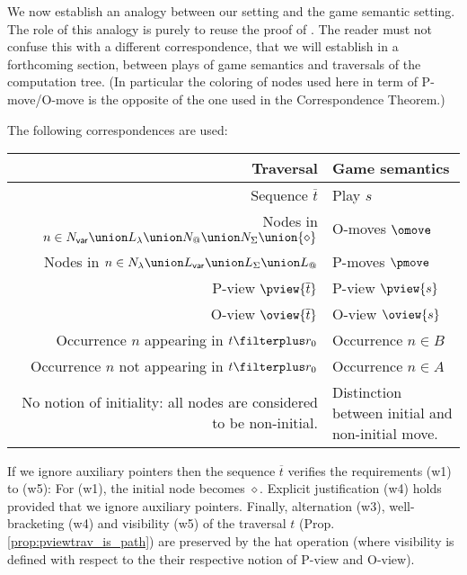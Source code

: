 We now establish an analogy between our setting and the game
semantic setting. The role of this analogy is purely to reuse the
proof of \cite{hylandong_pcf}. The reader must not confuse this with
a different correspondence, that we will establish in a forthcoming
section, between plays of game semantics and traversals of the
computation tree. (In particular the coloring of nodes used here in
term of P-move/O-move is the opposite of the one used in the
Correspondence Theorem.)

The following correspondences are used:
\begin{center}
\begin{tabular}{r|p{6cm}}
{\bf Traversal} & {\bf Game semantics} \\
\hline\hline
Sequence $\overline{t}$ & Play $s$ \\
Nodes in $n \in N_{\sf var} \union L_\lambda \union N_@ \union N_\Sigma \union \{\diamond\}$ & O-moves $\omove$ \\
Nodes in $n \in N_\lambda \union L_{\sf var} \union L_\Sigma \union L_@$ & P-moves $\pmove$\\
P-view $\pview{\overline{t}}$  & P-view $\pview{s}$\\
O-view $\oview{\overline{t}}$  & O-view $\oview{s}$\\
Occurrence $n$ appearing in $t\filterplus r_0$ & Occurrence $n \in B$ \\
Occurrence $n$ not appearing in $t\filterplus r_0$ & Occurrence $n \in A$ \\
\parbox[t]{6cm}{\raggedleft No notion of initiality: all nodes are considered to be non-initial.} & Distinction between initial and non-initial move.
\end{tabular}
\end{center}

If we ignore auxiliary pointers then the sequence $\overline{t}$
verifies the requirements (w1) to (w5): For (w1), the initial node
becomes $\diamond$. Explicit justification (w4) holds provided that
we ignore auxiliary pointers. Finally, alternation (w3),
well-bracketing (w4) and visibility (w5) of the traversal $t$ (Prop.
\ref{prop:pviewtrav_is_path}) are preserved by the hat operation
(where visibility is defined with respect to the their respective
notion of P-view and O-view).

